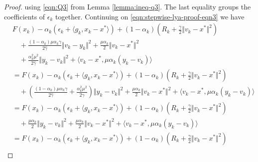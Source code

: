 \documentclass[12pt]{article}
\begin{document}
\begin{proof}
        using \eqref{eqn:Q3} from Lemma \ref{lemma:ineq-q3}.
        The last equality groups the coefficients of $\epsilon_k$ together.
        Continuing on \eqref{eqn:stepwise-lya-proof-eqn3} we have
        \begin{align}\label{eqn:stepwise-lya-proof-eqn3.1}
            &
            F(x_k) - \alpha_k(\epsilon_k + \langle g_k, x_k - x^*\rangle)
            +
            (1 - \alpha_k)\left(
                R_k + \frac{\gamma}{2}\Vert v_k - x^*\Vert^2
            \right)\nonumber
            \\&\quad
                + \frac{(1 - \alpha_k)\mu\alpha_k\gamma}{2\hat \gamma}\Vert v_k - y_k\Vert^2
                + \frac{\mu \alpha_k}{2}\Vert v_k - x^*\Vert^2 \nonumber
            \\&\quad
                + \frac{\alpha_k^2 \mu^2}{2\hat \gamma}\Vert y_k - v_k\Vert^2
                + \langle v_k - x^*, \mu\alpha_k(y_k - v_k)\rangle
            \nonumber\\
            &=
            F(x_k) - \alpha_k(\epsilon_k + \langle g_k, x_k - x^*\rangle)
            +
            (1 - \alpha_k)\left(
                R_k + \frac{\gamma}{2}\Vert v_k - x^*\Vert^2
            \right)
            \nonumber\\ &\quad
                +
                \left(
                    \frac{(1 - \alpha_k)\mu\alpha_k\gamma}{2\hat \gamma}
                    +
                    \frac{\alpha_k^2 \mu^2}{2\hat \gamma}
                \right)\Vert y_k - v_k\Vert^2
                + \frac{\mu \alpha_k}{2}\Vert v_k - x^*\Vert^2
                + \langle v_k - x^*, \mu\alpha_k(y_k - v_k)\rangle
            \nonumber\\
            & =
            F(x_k) - \alpha_k(\epsilon_k + \langle g_k, x_k - x^*\rangle)
            +
            (1 - \alpha_k)\left(
                R_k + \frac{\gamma}{2}\Vert v_k - x^*\Vert^2
            \right)
            \nonumber\\ &\quad
                +
                \frac{\mu \alpha_k}{2}\Vert y_k - v_k\Vert^2
                + \frac{\mu \alpha_k}{2}\Vert v_k - x^*\Vert^2
                + \langle v_k - x^*, \mu\alpha_k(y_k - v_k)\rangle
            \nonumber\\ &=
            F(x_k) - \alpha_k(\epsilon_k + \langle g_k, x_k - x^*\rangle)
            +
            (1 - \alpha_k)\left(
                R_k + \frac{\gamma}{2}\Vert v_k - x^*\Vert^2
            \right)
            \nonumber\\ &\quad

\end{align}
\end{proof}
\end{document}
